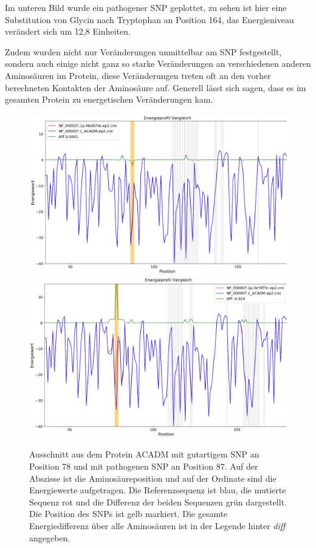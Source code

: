 Im unteren Bild wurde ein pathogener \ac{SNP} geplottet, zu sehen ist hier eine Substitution von Glycin nach Tryptophan an Position 164, das Energieniveau verändert sich um 12,8 Einheiten. 

Zudem wurden nicht nur Veränderungen unmittelbar am \ac{SNP} festgestellt, sondern auch einige nicht ganz so starke Veränderungen an verschiedenen anderen Aminosäuren im Protein, diese Veränderungen treten oft an den vorher berechneten Kontakten der Aminosäure auf. Generell lässt sich sagen, dass es im gesamten Protein zu energetischen Veränderungen kam.

\begin{figure}
    \centering
    \includegraphics[width=.95\textwidth]{images/comp_plot_ACADM_Met87Ile.png}
    \includegraphics[width=.95\textwidth]{images/comp_plot_ACADM_Ile78Thr.png}
    \caption{Ausschnitt aus dem Protein ACADM mit gutartigem \ac{SNP} an Position 78 und mit pathogenen \ac{SNP} an Position 87. Auf der Abszisse ist die Aminosäureposition und auf der Ordinate sind die Energiewerte aufgetragen. Die Referenzsequenz ist blau, die mutierte Sequenz rot und die Differenz der beiden Sequenzen grün dargestellt. Die Position des \ac{SNP}s ist gelb markiert. Die gesamte Energiedifferenz über alle Aminosäuren ist in der Legende hinter \emph{diff} angegeben.}
    \label{fig:comp_plot_ACADM}
\end{figure}

